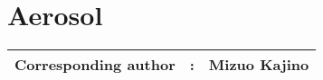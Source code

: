 \chapter{Aerosol}
{\bf \Large
\begin{tabular}{ccc}
\hline
  Corresponding author & : & Mizuo Kajino\\
\hline
\end{tabular}
}
